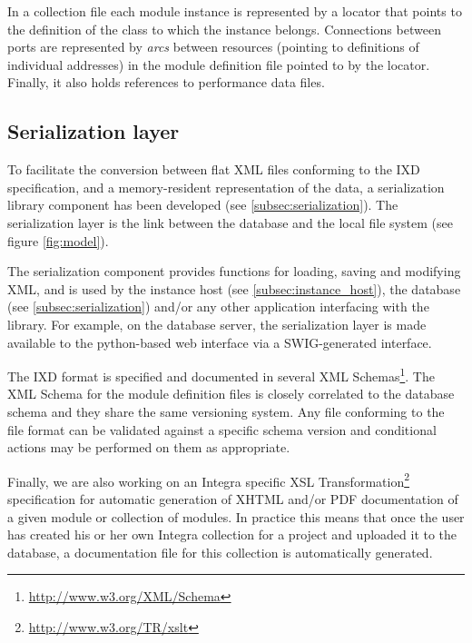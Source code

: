 \documentclass{article}
\begin{document}
In a collection file each module instance is represented by a locator that points to the definition of the class to which the instance belongs. Connections between ports are represented by \emph{arcs} between resources (pointing to definitions of individual addresses) in the module definition file pointed to by the locator. Finally, it also holds references to performance data files.


\subsection{Serialization layer}\label{sec:serialization_layer}

To facilitate the conversion between flat XML files conforming to the IXD specification, and a memory-resident representation of the data, a serialization library component has been developed (see \ref{subsec:serialization}). The serialization layer is the link  between the database and the local file system (see figure \ref{fig:model}).

The serialization component provides functions for loading, saving and modifying XML, and is used by the instance host (see \ref{subsec:instance_host}), the database (see \ref{subsec:serialization}) and/or any other application interfacing with the library. For example, on the database server, the serialization layer is made available to the python-based web interface via a SWIG-generated interface.

The IXD format is specified and documented in several XML Schemas\footnote{\url{http://www.w3.org/XML/Schema}}. The XML Schema for the module definition files is closely correlated to the database schema and they share the same versioning system. Any file conforming to the file format can be validated against a specific schema version and conditional actions may be performed on them as appropriate.

Finally, we are also working on an Integra specific XSL Transformation\footnote{\url{http://www.w3.org/TR/xslt}} specification for automatic generation of XHTML and/or PDF documentation of a given module or collection of modules. In practice this means that once the user has created his or her own Integra collection for a project and uploaded it to the database, a documentation file for this collection is automatically generated.
\end{document}
